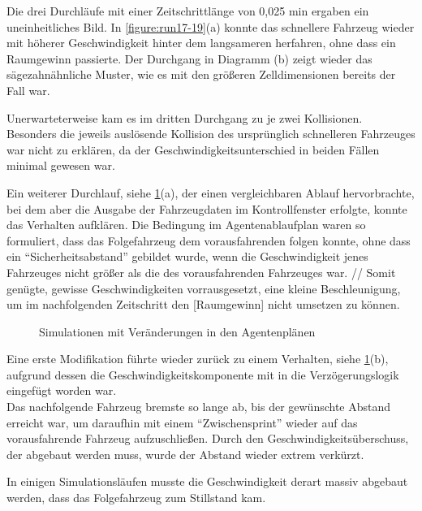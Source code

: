 Die drei Durchläufe mit einer Zeitschrittlänge von 0,025 min ergaben ein uneinheitliches Bild.
In \cref{figure:run17-19}(a) konnte das schnellere Fahrzeug wieder mit höherer Geschwindigkeit hinter dem langsameren herfahren, ohne dass ein Raumgewinn passierte.
Der Durchgang in Diagramm (b) zeigt wieder das sägezahnähnliche Muster, wie es mit den größeren Zelldimensionen bereits der Fall war.

Unerwarteterweise kam es im dritten Durchgang zu je zwei Kollisionen.
Besonders die jeweils auslösende Kollision des ursprünglich schnelleren Fahrzeuges war nicht zu erklären, da der Geschwindigkeitsunterschied in beiden Fällen minimal gewesen war.

Ein weiterer Durchlauf, siehe \cref{figure:run19a-c}(a), der einen vergleichbaren Ablauf hervorbrachte, bei dem aber die Ausgabe der Fahrzeugdaten im Kontrollfenster erfolgte, konnte das Verhalten aufklären.
Die Bedingung im Agentenablaufplan waren so formuliert, dass das Folgefahrzeug dem vorausfahrenden folgen konnte, ohne dass ein \enquote{Sicherheitsabstand} gebildet wurde, wenn die Geschwindigkeit jenes Fahrzeuges nicht größer als die des vorausfahrenden Fahrzeuges war. 
//
Somit genügte, gewisse Geschwindigkeiten vorrausgesetzt, eine kleine Beschleunigung, um im nachfolgenden Zeitschritt den [Raumgewinn] nicht umsetzen zu können.

\begin{figure}[hptb]
  \centering 
   \qquad 
   \qquad 
  \caption{Simulationen mit Veränderungen in den Agentenplänen} 
  \label{figure:run19a-c}
\end{figure}

Eine erste Modifikation führte wieder zurück zu einem Verhalten, siehe \cref{figure:run19a-c}(b), aufgrund dessen die Geschwindigkeitskomponente mit in die Verzögerungslogik eingefügt worden war. 
\\
Das nachfolgende Fahrzeug bremste so lange ab, bis der gewünschte Abstand erreicht war, um daraufhin mit einem \enquote{Zwischensprint} wieder auf das vorausfahrende Fahrzeug aufzuschließen.
Durch den Geschwindigkeitsüberschuss, der abgebaut werden muss, wurde der Abstand wieder extrem verkürzt.

In einigen Simulationsläufen musste die Geschwindigkeit derart massiv abgebaut werden, dass das Folgefahrzeug zum Stillstand kam.

